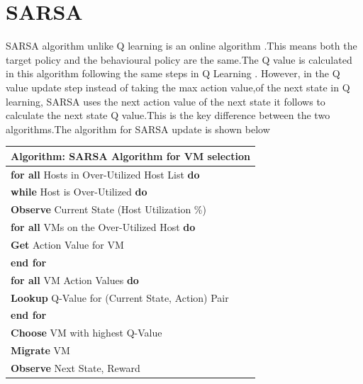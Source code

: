\documentclass[a4paper,12pt]{Classes/RoboticsLaTeX}
\begin{document}
    \section{SARSA}

    SARSA algorithm unlike Q learning is an online algorithm .This means both the target policy and the behavioural policy are the same.The Q value is calculated in this algorithm following the same steps in Q Learning . However, in the Q value update  step instead of taking the max action value,of the next state in Q learning, SARSA  uses  the next action value of the next state it follows to calculate the next state Q value.This is the key difference between the two algorithms.The algorithm for SARSA update is shown below\cite{Lukethesis}

     \begin{center}
    \begin{tabular}{|l|}
    \hline
    \textbf{Algorithm: SARSA Algorithm for VM selection} \\
    \hline
    \textbf{for all} Hosts in Over-Utilized Host List \textbf{do} \\
    \hspace{1em} \textbf{while} Host is Over-Utilized \textbf{do} \\
    \hspace{2em} \textbf{Observe} Current State (Host Utilization \%) \\
    \hspace{2em} \textbf{for all} VMs on the Over-Utilized Host \textbf{do} \\
    \hspace{3em} \textbf{Get} Action Value for VM \\
    \hspace{2em} \textbf{end for} \\
    \hspace{2em} \textbf{for all} VM Action Values \textbf{do} \\
    \hspace{3em} \textbf{Lookup} Q-Value for (Current State, Action) Pair \\
    \hspace{2em} \textbf{end for} \\
    \hspace{2em} \textbf{Choose} VM with highest Q-Value \\
    \hspace{2em} \textbf{Migrate} VM \\
    \hspace{2em} \textbf{Observe} Next State, Reward \\

\end{tabular}
\end{center}
\end{document}
